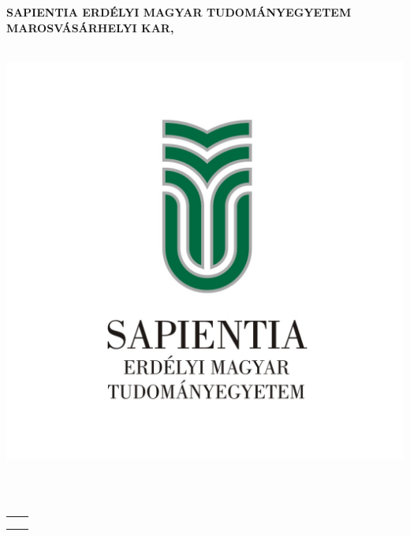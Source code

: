 \begin{titlepage}
	\begin{center}
	
		\large{\bfseries SAPIENTIA ERDÉLYI MAGYAR TUDOMÁNYEGYETEM} \\
		\large{\bfseries MAROSVÁSÁRHELYI KAR,} \\
		\large{\bfseries \szakHU} \\[2.5cm]
			\begin{center}
			\includegraphics[scale=2]{images/sapientia-hu}
		\end{center}
		\vspace{0.4cm}
		\Large{\Large  \cimHu}\\[0.8cm]
		\vspace{0.2cm}
		\textsc{\Large \bfseries \dolgozattipusHU}\\[2.5cm]
		
		{
			\large
		
			\renewcommand{\arraystretch}{0.85}
			\begin{tabular}{cc}
				 \makebox[6.5cm]{Témavezető:} & \makebox[6.5cm]{Végzős hallgató:} \\ \noalign{\smallskip}
				 \makebox[6.5cm]{\temavezetoHu,} & \makebox[6.5cm]{\szerzo} \\ {\temavezetoAfokozat}
			\end{tabular}
		}
		
		\vfill
		{\large \bfseries \ev}
	\end{center}
\end{titlepage}
